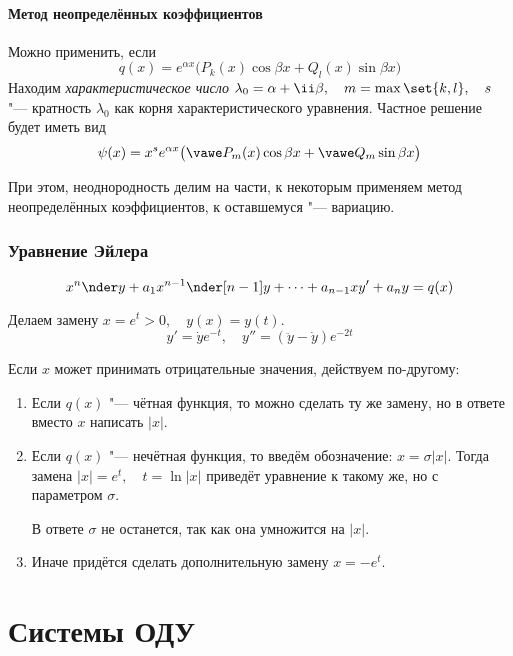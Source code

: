 \subsection*{Метод неопределённых коэффициентов}

Можно применить, если
$$ q(x) = e^{\alpha x} \bigl( P_k(x) \cos \beta x + Q_l(x) \sin \beta x \bigr) $$
Находим \emph{характеристическое число} $ \lambda_0 = \alpha + \ii \beta, \quad m = \max \set{k, l}, \quad s $ "--- кратность $ \lambda_0 $ как корня характеристического уравнения.
Частное решение будет иметь вид
$$ \psi(x) = x^s e^{\alpha x} \bigl( \vawe P_m(x) \cos \beta x + \vawe Q_m \sin \beta x \bigr) $$

При этом, неоднородность делим на части, к некоторым применяем метод неопределённых коэффициентов, к оставшемуся "--- вариацию.

\section{Уравнение Эйлера}

$$ x^n \nder y + a_1 x^{n - 1} \nder[n - 1] y + \dots + a_{n - 1} x y' + a_n y = q(x) $$

Делаем замену $ x = e^t > 0, \quad y(x) = y(t) $.
$$ y' = \dot y e^{-t}, \quad y'' = (\ddot y - \dot y) e^{-2t} $$

Если $ x $ может принимать отрицательные значения, действуем по-другому:
\begin{enumerate}
	\item Если $ q(x) $ "--- чётная функция, то можно сделать ту же замену, но в ответе вместо $ x $ написать $ |x| $.
	\item Если $ q(x) $ "--- нечётная функция, то введём обозначение: $ x = \sigma |x| $.
		Тогда замена $ |x| = e^t, \quad t = \ln |x| $ приведёт уравнение к такому же, но с параметром $ \sigma $.
		\begin{control}
			В ответе $ \sigma $ не останется, так как она умножится на $ |x| $.
		\end{control}
	\item Иначе придётся сделать дополнительную замену $ x = -e^t $.
\end{enumerate}

\part{Системы ОДУ}

